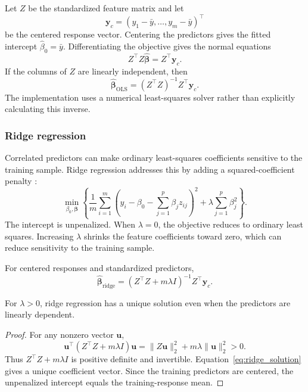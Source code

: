 Let $Z$ be the standardized feature matrix and let
\[
\mathbf y_c=(y_1-\bar y,\ldots,y_m-\bar y)^\top
\]
be the centered response vector. Centering the predictors gives the fitted intercept $\widehat\beta_0=\bar y$. Differentiating the objective gives the normal equations
\begin{equation}
Z^\top Z\widehat{\boldsymbol\beta}=Z^\top\mathbf y_c.
\end{equation}
If the columns of $Z$ are linearly independent, then
\begin{equation}
\widehat{\boldsymbol\beta}_{\mathrm{OLS}}
=(Z^\top Z)^{-1}Z^\top\mathbf y_c.
\end{equation}
The implementation uses a numerical least-squares solver rather than explicitly calculating this inverse.

\subsubsection{Ridge regression}

Correlated predictors can make ordinary least-squares coefficients sensitive to the training sample. Ridge regression addresses this by adding a squared-coefficient penalty \cite{vanwieringen2026ridge}:
\begin{equation}
\min_{\beta_0,\boldsymbol\beta}
\left\{
\frac{1}{m}\sum_{i=1}^{m}
\left(y_i-\beta_0-\sum_{j=1}^{p}\beta_jz_{ij}\right)^2
+
\lambda\sum_{j=1}^{p}\beta_j^2
\right\}.
\label{eq:ridge}
\end{equation}
The intercept is unpenalized. When $\lambda=0$, the objective reduces to ordinary least squares. Increasing $\lambda$ shrinks the feature coefficients toward zero, which can reduce sensitivity to the training sample.

For centered responses and standardized predictors,
\begin{equation}
\widehat{\boldsymbol\beta}_{\mathrm{ridge}}
=
(Z^\top Z+m\lambda I)^{-1}Z^\top\mathbf y_c.
\label{eq:ridge_solution}
\end{equation}

\begin{prop}
\label{prop:ridge_unique}
For $\lambda>0$, ridge regression has a unique solution even when the predictors are linearly dependent.
\end{prop}

\begin{proof}
For any nonzero vector $\mathbf u$,
\[
\mathbf u^\top(Z^\top Z+m\lambda I)\mathbf u
=
\|Z\mathbf u\|_2^2+m\lambda\|\mathbf u\|_2^2>0.
\]
Thus $Z^\top Z+m\lambda I$ is positive definite and invertible. Equation~\eqref{eq:ridge_solution} gives a unique coefficient vector. Since the training predictors are centered, the unpenalized intercept equals the training-response mean.
\end{proof}

